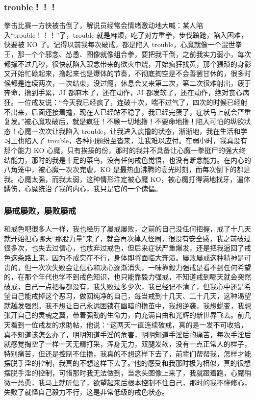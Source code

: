 \subsubsection{trouble！！！}

拳击比赛一方快被击倒了，解说员经常会情绪激动地大喊：某人陷入“trouble！！！”了，trouble 就是麻烦，吃了对方重拳，步伐踉跄，陷入困难，快要被 KO 了。记得以前我每次破戒，都是陷入 trouble，心魔就像一个混世拳王，那一个个邪念、怂恿、图像就像组合拳，要把我干倒，之前我实力弱小，每次都撑不过几秒，很快就陷入跟念带来的欲火中烧，开始疯狂找黄，那个猥琐的身影又开始忙碌起来，撸起来也是爆体的节奏，不彻底掏空是不会善罢甘休的，很多时候都是连续两次，一次结束，没过瘾，休息会又来第二次，第二次很难射出，疲于奔命，撸到手累，JJ 都麻木了，还在动作，JJ 都发软了，还在动作，绝对丧心病狂。一位戒友说：“今天我已经疯了，连破十次，喘不过气了，四次的时候已经射不出来，后面还接着撸，现在人已经站不稳了，我已经完蛋了，症状马上就会严重复发。”被心魔攻破后，就是疯狂！不顾一切地撸！不要命地撸！陷入可怕的纵欲状态！心魔一次次让我陷入 trouble，让我进入疯撸的状态，渐渐地，我在生活和学习上也陷入了 trouble，各种问题纷至沓来，让我难以应付。在弱小时，我真没有那个能力 KO 心魔，只有挨揍的份，那时的我并不具备让心魔一拳挺尸的强大终结能力，那时的我是十足的菜鸟，没有任何戒色觉悟，也没有断念能力。在内心的八角笼中，被心魔一次次完虐，KO 是最热血沸腾的高光时刻，而每次倒下的都是我。心魔太强，而我太弱，这种情形注定被心魔 KO，被心魔打得满地找牙，遍体鳞伤，心魔统治了我的内心，我只是它的一个傀儡。

\subsubsection{屡戒屡败，屡败屡戒}

和戒色吧很多人一样，我也经历了屡戒屡败，之前的自己没任何把握，戒了十几天就开始担心哪天“那股力量”来了，就会再次掉入怪圈，很没有安全感，我之前破过很多次，也失去过信心，也放弃过戒色，但后来症状严重爆发，还是把我逼回了戒色这条路上来，因为不戒实在不行，身体即将面临大奔溃。屡败屡戒这种精神是可贵的，但一次次失败会让信心和决心逐渐消失，一味靠毅力强戒是看不到任何希望的，在那个年代也学不到戒色知识，也只能靠毅力强戒，不知道戒到哪天就会突然破戒，自己一点把握都没有，我失败过多少次，我已经记不清了，但我心中还是希望自己能戒掉这个恶习，做回纯净的自己，每当戒到十几天、二十几天，这种渴望就越发强烈。我不想让自己永远困锁在幽暗的撸茧中，我想逆袭，我想蜕变，我想张开自己的灵魂之翼，带着强劲的生命力，向充满自由和光辉的新世界飞去。前几天看到一位戒友的求助帖，他说：“这两天一直连续破戒，真的是一发不可收拾，真不知道该怎么办了，明明知道手淫的危害，明明知道手淫后的痛苦，每次手淫后就感觉掏空了一样一天无精打采，浑身无力，双腿发软，没有一点正常人的样子，特别痛苦，但还是控制不住撸，我真的不想这样下去了，前辈们帮帮我，怎样才能摆脱手淫的控制，我真的不想这样下去了。”他的感受和我那时极为相似，真的很想摆脱手淫的控制，可惜那时我无法做到，当念头图像上来了，我就跟着跑，心魔稍微一怂恿，我马上就听信了，欲望起来后根本控制不住自己，那时的我不懂修心，失败了就怪自己毅力不行，这是非常低级的戒色状态。

